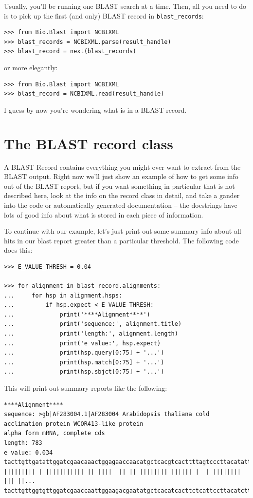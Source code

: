\documentclass{report}
\begin{document}
Usually, you'll be running one BLAST search at a time. Then, all you need
to do is to pick up the first (and only) BLAST record in \verb|blast_records|:
\begin{verbatim}
>>> from Bio.Blast import NCBIXML
>>> blast_records = NCBIXML.parse(result_handle)
>>> blast_record = next(blast_records)
\end{verbatim}
\noindent or more elegantly:
\begin{verbatim}
>>> from Bio.Blast import NCBIXML
>>> blast_record = NCBIXML.read(result_handle)
\end{verbatim}

I guess by now you're wondering what is in a BLAST record.

\section{The BLAST record class}

A BLAST Record contains everything you might ever want to extract from the
BLAST output. Right now we'll just show
an example of how to get some info out of the BLAST report, but if you
want something in particular that is not described here, look at the
info on the record class in detail, and take a gander into the code or
automatically generated documentation -- the docstrings have lots of
good info about what is stored in each piece of information.

To continue with our example, let's just print out some summary info
about all hits in our blast report greater than a particular
threshold. The following code does this:

\begin{verbatim}
>>> E_VALUE_THRESH = 0.04

>>> for alignment in blast_record.alignments:
...     for hsp in alignment.hsps:
...         if hsp.expect < E_VALUE_THRESH:
...             print('****Alignment****')
...             print('sequence:', alignment.title)
...             print('length:', alignment.length)
...             print('e value:', hsp.expect)
...             print(hsp.query[0:75] + '...')
...             print(hsp.match[0:75] + '...')
...             print(hsp.sbjct[0:75] + '...')
\end{verbatim}

This will print out summary reports like the following:

\begin{verbatim}
****Alignment****
sequence: >gb|AF283004.1|AF283004 Arabidopsis thaliana cold acclimation protein WCOR413-like protein
alpha form mRNA, complete cds
length: 783
e value: 0.034
tacttgttgatattggatcgaacaaactggagaaccaacatgctcacgtcacttttagtcccttacatattcctc...
||||||||| | ||||||||||| || ||||  || || |||||||| |||||| |  | |||||||| ||| ||...
tacttgttggtgttggatcgaaccaattggaagacgaatatgctcacatcacttctcattccttacatcttcttc...
\end{verbatim}
\end{document}
